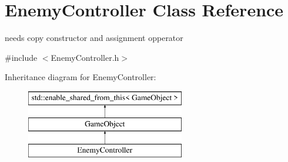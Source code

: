 \hypertarget{class_enemy_controller}{}\section{Enemy\+Controller Class Reference}
\label{class_enemy_controller}


needs copy constructor and assignment opperator  




{\ttfamily \#include $<$Enemy\+Controller.\+h$>$}

Inheritance diagram for Enemy\+Controller\+:\begin{figure}[H]
\begin{center}
\leavevmode
\includegraphics[height=3.000000cm]{dc/d01/class_enemy_controller}
\end{center}
\end{figure}
